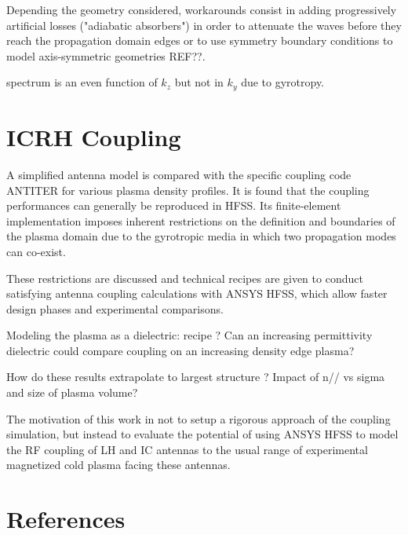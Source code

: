 \documentclass[preprint,3p,twocolumn]{elsarticle}
\begin{document}
Depending the geometry considered, workarounds consist in adding progressively artificial losses ("adiabatic absorbers") in order to attenuate the waves before they reach the propagation domain edges\cite{Oskooi2008} or to use symmetry boundary conditions to model axis-symmetric geometries REF??.   

spectrum is an even function of $k_z$ but not in $k_y$ due to gyrotropy.

\section{ICRH Coupling}

A simplified antenna model is compared with the specific coupling code ANTITER for various plasma density profiles. It is found that the coupling performances can generally be reproduced in HFSS. Its finite-element implementation imposes inherent restrictions on the definition and boundaries of the plasma domain due to the gyrotropic media in which two propagation modes can co-exist. 

These restrictions are discussed and technical recipes are given to conduct satisfying antenna coupling calculations with ANSYS HFSS, which allow faster design phases and experimental comparisons. 






Modeling the plasma as a dielectric: recipe ? Can an increasing permittivity dielectric could compare  coupling on an increasing density edge plasma? 


How do these results extrapolate to largest structure ? Impact of n// vs sigma and size of plasma volume? 



The motivation of this work in not to setup a rigorous approach of the coupling simulation, but instead to evaluate the potential of using ANSYS HFSS to model the RF coupling of LH and IC antennas to the usual range of experimental magnetized cold plasma facing these antennas.



\section*{References}


\end{document}
